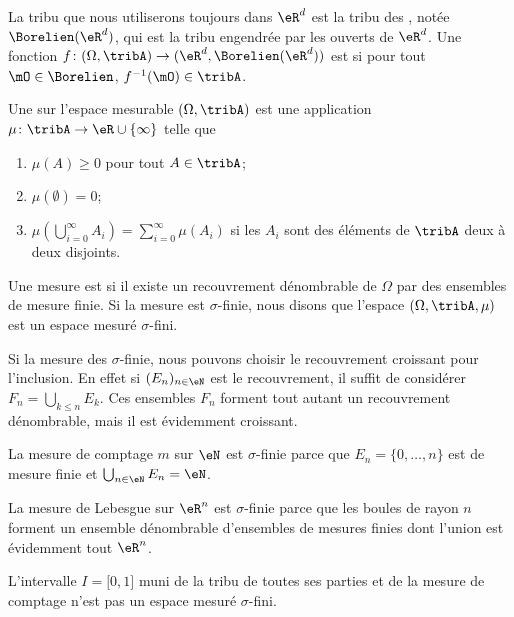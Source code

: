 La tribu que nous utiliserons toujours dans \( \eR^d\) est la tribu des , notée \( \Borelien(\eR^d)\), qui est la tribu engendrée par les ouverts de \( \eR^d\). Une fonction \( f\colon (\Omega,\tribA)\to (\eR^d,\Borelien(\eR^d))\) est  si pour tout \( \mO\in\Borelien\), \( f^{-1}(\mO)\in\tribA\).

\begin{definition}
    Une  sur l'espace mesurable \( (\Omega,\tribA)\) est une application \( \mu\colon \tribA\to \eR\cup\{ \infty \}\) telle que
    \begin{enumerate}
        \item
            \( \mu(A)\geq 0\) pour tout \( A\in\tribA\);
        \item
            \( \mu(\emptyset)=0\);
        \item   \label{ItemQFjtOjXiii}
            \( \mu\left( \bigcup_{i=0}^{\infty}A_i\right)=\sum_{i=0}^{\infty}\mu(A_i)\) si les \( A_i\) sont des éléments de \( \tribA\) deux à deux disjoints.
    \end{enumerate}
    Une mesure est  si il existe un recouvrement dénombrable de \( \Omega\) par des ensembles de mesure finie. Si la mesure est $\sigma$-finie, nous disons que l'espace \( (\Omega,\tribA,\mu)\) est un espace mesuré $\sigma$-fini.
\end{definition}

Si la mesure des \( \sigma\)-finie, nous pouvons choisir le recouvrement croissant pour l'inclusion. En effet si \( (E_n)_{n\in \eN}\) est le recouvrement, il suffit de considérer \( F_n=\bigcup_{k\leq n}E_k\). Ces ensembles \( F_n\) forment tout autant un recouvrement dénombrable, mais il est évidemment croissant.

\begin{example}
    La mesure de comptage \( m\) sur \( \eN\) est \( \sigma\)-finie parce que \( E_n=\{ 0,\ldots, n \}\) est de mesure finie et \( \bigcup_{n\in \eN}E_n=\eN\).
\end{example}

\begin{example}
    La mesure de Lebesgue sur \( \eR^n\) est \( \sigma\)-finie parce que les boules de rayon \( n\) forment un ensemble dénombrable d'ensembles de mesures finies dont l'union est évidemment tout \( \eR^n\).

    L'intervalle \( I=\mathopen[ 0 , 1 \mathclose]\) muni de la tribu de toutes ses parties et de la mesure de comptage n'est pas un espace mesuré \( \sigma\)-fini.
\end{example}

